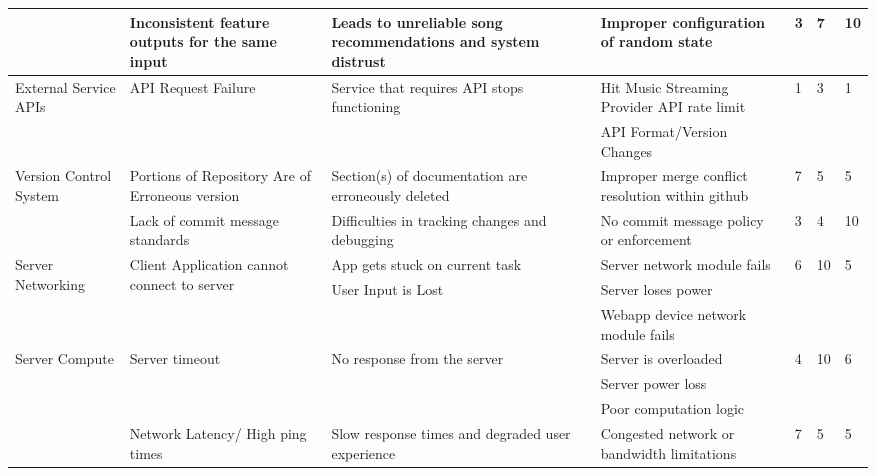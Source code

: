 \documentclass{article}
\begin{document}
\begin{landscape}
\begin{table}[]
{\begin{tabular}{|l|l|l|l|l|l|l|}
     & Inconsistent feature outputs for the same input & Leads to unreliable song recommendations and system distrust & Improper configuration of random state & 3 & 7 & 10 \\ \hline
    \multirow{5}{*}{External Service APIs} & \multirow{5}{*}{API Request Failure} & \multirow{5}{*}{Service that requires API stops functioning} & \multirow{3}{*}{Hit Music Streaming Provider API rate limit} & \multirow{5}{*}{1} & \multirow{5}{*}{3} & \multirow{5}{*}{1} \\
     &  &  &  &  &  &  \\
     &  &  &  &  &  &  \\
     &  &  & \multirow{2}{*}{API Format/Version Changes} &  &  &  \\
     &  &  &  &  &  &  \\ \hline
    \multirow{3}{*}{Version Control System} & \multirow{2}{*}{Portions of Repository Are of Erroneous version} & \multirow{2}{*}{Section(s) of documentation are erroneously deleted} & \multirow{2}{*}{Improper merge conflict resolution within github} & \multirow{2}{*}{7} & \multirow{2}{*}{5} & \multirow{2}{*}{5} \\
     &  &  &  &  &  &  \\ \cline{2-7} 
     & Lack of commit message standards & Difficulties in tracking changes and debugging & No commit message policy or enforcement & 3 & 4 & 10 \\ \hline
    \multirow{3}{*}{Server Networking} & \multirow{3}{*}{Client Application cannot connect to server} & App gets stuck on current task & Server network module fails & \multirow{3}{*}{6} & \multirow{3}{*}{10} & \multirow{3}{*}{5} \\
     &  & \multirow{2}{*}{User Input is Lost} & Server loses power &  &  &  \\
     &  &  & Webapp device network module fails &  &  &  \\ \hline
    \multirow{4}{*}{Server Compute} & \multirow{3}{*}{Server timeout} & \multirow{3}{*}{No response from the server} & Server is overloaded & \multirow{3}{*}{4} & \multirow{3}{*}{10} & \multirow{3}{*}{6} \\
     &  &  & Server power loss &  &  &  \\
     &  &  & Poor computation logic &  &  &  \\ \cline{2-7} 
     & Network Latency/ High ping times & Slow response times and degraded user experience & Congested network or bandwidth limitations & 7 & 5 & 5 \\ \hline

\end{tabular}}
\end{table}
\end{landscape}
\end{document}
